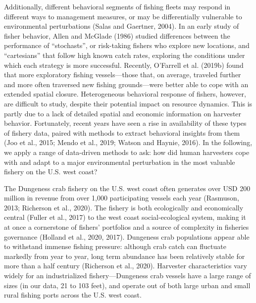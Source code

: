 \documentclass[]{elsarticle} %
\begin{document}
Additionally, different behavioral segments of fishing fleets may
respond in different ways to management measures, or may be
differentially vulnerable to environmental perturbations (Salas and
Gaertner, 2004). In an early study of fisher behavior, Allen and McGlade
(1986) studied differences between the performance of ``stochasts'', or
risk-taking fishers who explore new locations, and ``cartesians'' that
follow high known catch rates, exploring the conditions under which each
strategy is more successful. Recently, O'Farrell et al. (2019b) found
that more exploratory fishing vessels---those that, on average, traveled
further and more often traversed new fishing grounds---were better able
to cope with an extended spatial closure. Heterogeneous behavioral
response of fishers, however, are difficult to study, despite their
potential impact on resource dynamics. This is partly due to a lack of
detailed spatial and economic information on harvester behavior.
Fortunately, recent years have seen a rise in availability of these
types of fishery data, paired with methods to extract behavioral
insights from them (Joo et al., 2015; Mendo et al., 2019; Watson and
Haynie, 2016). In the following, we apply a range of data-driven methods
to ask: how did human harvesters cope with and adapt to a major
environmental perturbation in the most valuable fishery on the U.S. west
coast?

The Dungeness crab fishery on the U.S. west coast often generates over
USD 200 million in revenue from over 1,000 participating vessels each
year (Rasmuson, 2013; Richerson et al., 2020). The fishery is both
ecologically and economically central (Fuller et al., 2017) to the west
coast social-ecological system, making it at once a cornerstone of
fishers' portfolios and a source of complexity in fisheries governance
(Holland et al., 2020, 2017). Dungeness crab populations appear able to
withstand immense fishing pressure: although crab catch can fluctuate
markedly from year to year, long term abundance has been relatively
stable for more than a half century (Richerson et al., 2020). Harvester
characteristics vary widely for an industrialized fishery---Dungeness
crab vessels have a large range of sizes (in our data, 21 to 103 feet),
and operate out of both large urban and small rural fishing ports across
the U.S. west coast.
\end{document}

